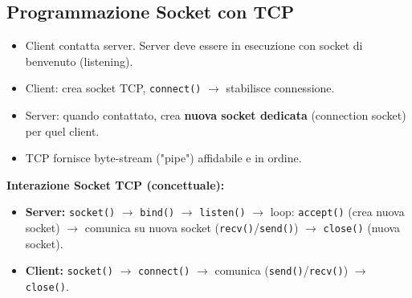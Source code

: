 \subsection{Programmazione Socket con TCP}
\begin{itemize}
    \item Client contatta server. Server deve essere in esecuzione con socket di benvenuto (listening).
    \item Client: crea socket TCP, \texttt{connect()} $\rightarrow$ stabilisce connessione.
    \item Server: quando contattato, crea \textbf{nuova socket dedicata} (connection socket) per quel client.
    \item TCP fornisce byte-stream ("pipe") affidabile e in ordine.
\end{itemize}
\textbf{Interazione Socket TCP (concettuale):}
\begin{itemize}
    \item \textbf{Server:} \texttt{socket()} $\rightarrow$ \texttt{bind()} $\rightarrow$ \texttt{listen()} $\rightarrow$ loop: \texttt{accept()} (crea nuova socket) $\rightarrow$ comunica su nuova socket (\texttt{recv()}/\texttt{send()}) $\rightarrow$ \texttt{close()} (nuova socket).
    \item \textbf{Client:} \texttt{socket()} $\rightarrow$ \texttt{connect()} $\rightarrow$ comunica (\texttt{send()}/\texttt{recv()}) $\rightarrow$ \texttt{close()}.
\end{itemize}
